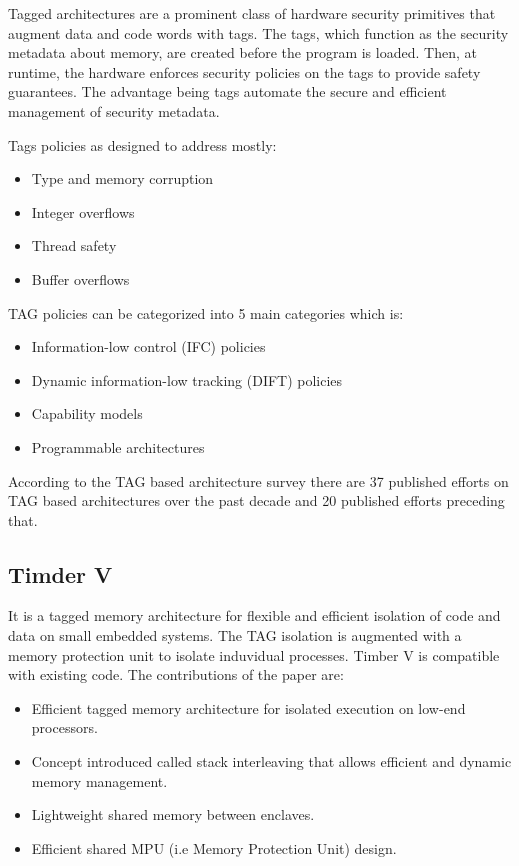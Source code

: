 Tagged architectures are a prominent class of hardware security primitives that augment data and code words
with tags. The tags, which function as the security metadata
about memory, are created before the program is loaded. 
Then, at runtime, the hardware enforces security policies on the tags to provide safety guarantees. 
The advantage being tags automate the secure and efficient management of security metadata. 

Tags policies as designed to address mostly:
\begin{itemize}
  \item Type and memory corruption
  \item Integer overflows
  \item Thread safety
  \item Buffer overflows
\end{itemize}

TAG policies can be categorized into 5 main categories which is:
\begin{itemize}
  \item Information-low control (IFC) policies
  \item Dynamic information-low tracking (DIFT) policies
  \item Capability models
  \item Programmable architectures
\end{itemize}
 
According to the TAG based architecture survey \cite{acmTAGSurvey} there are 37 published
efforts on TAG based architectures over the past decade and 20 published efforts preceding that. 

\subsection{Timder V \cite{weiser_timber-v_2019}}
 It is a tagged memory architecture for flexible and efficient isolation of code and data on 
 small embedded systems. The TAG isolation is augmented with a memory protection unit to isolate 
 induvidual processes. Timber V is compatible with existing code. The contributions of the paper 
 are: 
 \begin{itemize}
  \item Efficient tagged memory architecture for isolated execution on low-end processors. 
  \item Concept introduced called stack interleaving that allows efficient and dynamic memory management. 
  \item Lightweight shared memory between enclaves. 
  \item Efficient shared MPU (i.e Memory Protection Unit) design. 
 \end{itemize}
 

